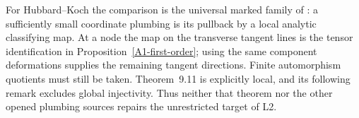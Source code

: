 For Hubbard--Koch the comparison is the universal marked family of \cite[Theorems 9.11 and 10.1, and \S13]{AHubbardKoch2014}: a sufficiently small coordinate plumbing is its pullback by a local analytic classifying map. At a node the map on the transverse tangent lines is the tensor identification in Proposition~\ref{A1-first-order}; using the same component deformations supplies the remaining tangent directions. Finite automorphism quotients must still be taken. Theorem~9.11 is explicitly local, and its following remark excludes global injectivity. Thus neither that theorem nor the other opened plumbing sources repairs the unrestricted target of L2.
